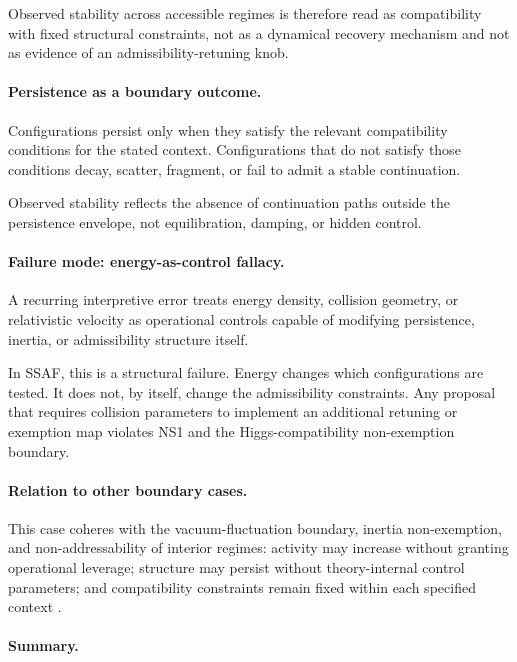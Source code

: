 \documentclass[aps,prx,onecolumn,11pt]{revtex4-2}
\theoremstyle{plain}
\theoremstyle{definition}
\theoremstyle{remark}
\begin{document}
Observed stability across accessible regimes is therefore read as
compatibility with fixed structural constraints, not as a dynamical
recovery mechanism and not as evidence of an admissibility-retuning
knob.

\paragraph{Persistence as a boundary outcome.}

Configurations persist only when they satisfy the relevant
compatibility conditions for the stated context. Configurations that do
not satisfy those conditions decay, scatter, fragment, or fail to admit
a stable continuation.

Observed stability reflects the absence of continuation paths outside
the persistence envelope, not equilibration, damping, or hidden control.

\paragraph{Failure mode: energy-as-control fallacy.}

A recurring interpretive error treats energy density, collision
geometry, or relativistic velocity as operational controls capable of
modifying persistence, inertia, or admissibility structure itself.

In SSAF, this is a structural failure. Energy changes which
configurations are tested. It does not, by itself, change the
admissibility constraints. Any proposal that requires collision
parameters to implement an additional retuning or exemption map
violates NS1 and the Higgs-compatibility non-exemption boundary.

\paragraph{Relation to other boundary cases.}

This case coheres with the vacuum-fluctuation boundary, inertia
non-exemption, and non-addressability of interior regimes: activity may
increase without granting operational leverage; structure may persist
without theory-internal control parameters; and compatibility
constraints remain fixed within each specified context
\cite{Pusz1978,WatanabeOshikawa2015}.

\paragraph{Summary.}
\end{document}
